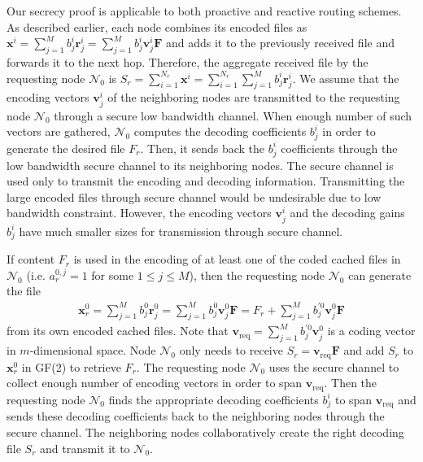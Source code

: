 \documentclass[10pt,journal]{IEEEtran}
\begin{document}
Our secrecy proof is applicable to both proactive and reactive routing schemes. As described earlier, each node combines  its encoded files as $ \mathbf{x}^i = \sum_{j=1}^M b_j^i \mathbf{r}_j^i = \sum_{j=1}^M b_j^i \mathbf{v}_j^i \mathbf{F} $ and adds it to the previously received file and forwards it to the next hop. Therefore, the aggregate received file by the requesting node $\mathcal{N}_0$ is 
$S_r = \sum_{i=1}^{N_r} \mathbf{x}^i = \sum_{i=1}^{N_r} \sum_{j=1}^M b_j^i \mathbf{r}_j^i.$
We assume that the encoding vectors $\mathbf{v}_j^i$ of the neighboring nodes are transmitted to the requesting node $\mathcal{N}_0$ through a secure low bandwidth channel. When enough number of such vectors are gathered, $\mathcal{N}_0$ computes the decoding coefficients $b_j^i$ in order to generate the desired file $F_r$. Then, it sends back the $b_j^i$ coefficients through the low bandwidth secure channel to its neighboring nodes. The secure channel is used only to transmit the encoding and decoding information. Transmitting the large encoded files through secure channel would be undesirable due to low bandwidth constraint. However, the encoding vectors $\mathbf{v}_j^i$ and the decoding gains $b_j^i$ have much smaller sizes for transmission through secure channel.%

If content $F_r$ is used in the encoding of at least one of the coded cached files in $\mathcal{N}_0$ (i.e. $a_r^{0,j}=1$ for some $1 \le j \le M$), then the requesting node $\mathcal{N}_0$ can generate the file 
\begin{align}
 \mathbf{x}^0_r = \sum_{j=1}^M b_j^0 \mathbf{r}_j^0 = \sum_{j=1}^M b_j^0 \mathbf{v}_j^0 \mathbf{F} = F_r + \sum_{j=1}^M b_j^{'0} \mathbf{v}_j^0 \mathbf{F}
\end{align}
from its own encoded cached files. Note that $\mathbf{v}_{\textrm{req}}=\sum_{j=1}^M b_j^{'0} \mathbf{v}_j^0$ is a coding vector in $m$-dimensional space. Node $\mathcal{N}_0$ only needs to receive $S_r = \mathbf{v}_{\textrm{req}}  \mathbf{F}$ and add  $S_r$ to $\mathbf{x}^0_r$ in GF(2) to retrieve $F_r$. The requesting node $\mathcal{N}_0$ uses the secure channel to collect enough number of encoding vectors in order to span $\mathbf{v}_{\textrm{req}}$. Then the requesting node $\mathcal{N}_0$ finds the appropriate decoding coefficients $b_j^i$ to span $\mathbf{v}_{\textrm{req}}$ and  sends these decoding coefficients back to the neighboring nodes through the secure channel. The neighboring nodes collaboratively create the right decoding file $S_r$ and transmit it to $\mathcal{N}_0$. 
\end{document}
